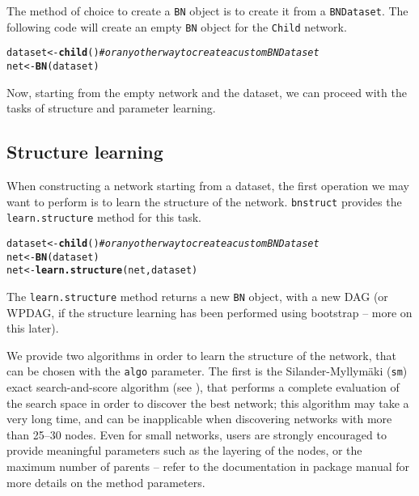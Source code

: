 \documentclass{article}\usepackage[]{graphicx}\usepackage[]{color}
\makeatletter
\newcommand{\hlcom}[1]{\textcolor[rgb]{0.678,0.584,0.686}{\textit{#1}}}%
\newcommand{\hlstd}[1]{\textcolor[rgb]{0.345,0.345,0.345}{#1}}%
\newcommand{\hlkwb}[1]{\textcolor[rgb]{0.69,0.353,0.396}{#1}}%
\newcommand{\hlkwd}[1]{\textcolor[rgb]{0.737,0.353,0.396}{\textbf{#1}}}%
\newenvironment{kframe}{%
 \def\at@end@of@kframe{}%
 \ifinner\ifhmode%
  \def\at@end@of@kframe{\end{minipage}}%
  \begin{minipage}{\columnwidth}%
 \fi\fi%
 \def\FrameCommand##1{\hskip\@totalleftmargin \hskip-\fboxsep
 \colorbox{shadecolor}{##1}\hskip-\fboxsep
     \hskip-\linewidth \hskip-\@totalleftmargin \hskip\columnwidth}%
 \MakeFramed {\advance\hsize-\width
   \@totalleftmargin\z@ \linewidth\hsize
   \@setminipage}}%
 {\par\unskip\endMakeFramed%
 \at@end@of@kframe}
\newenvironment{knitrout}{}{} %
\newcommand{\Robject}[1]{{\texttt{#1}}}
\newcommand{\Rpackage}[1]{{\texttt{#1}}}
\newcommand{\Rmethod}[1]{{\texttt{#1}}}
\makeatother
\begin{document}
The method of choice to create a \Robject{BN} object is to create it from a \Robject{BNDataset}.
The following code will create an empty \Robject{BN} object for the \texttt{Child} network.
\begin{knitrout}
\color{fgcolor}\begin{kframe}
\begin{alltt}
\hlstd{dataset} \hlkwb{<-} \hlkwd{child}\hlstd{()} \hlcom{# or any other way to create a custom BNDataset}
\hlstd{net}     \hlkwb{<-} \hlkwd{BN}\hlstd{(dataset)}
\end{alltt}
\end{kframe}
\end{knitrout}


Now, starting from the empty network and the dataset, we can proceed with the tasks of structure and parameter learning.

\subsection{Structure learning}\label{sec:structurelearning}
When constructing a network starting from a dataset, the first operation we may want to perform is to learn
the structure of the network. \Rpackage{bnstruct} provides the \Rmethod{learn.structure} method for this task.
\begin{knitrout}
\color{fgcolor}\begin{kframe}
\begin{alltt}
\hlstd{dataset} \hlkwb{<-} \hlkwd{child}\hlstd{()} \hlcom{# or any other way to create a custom BNDataset}
\hlstd{net}     \hlkwb{<-} \hlkwd{BN}\hlstd{(dataset)}
\hlstd{net}     \hlkwb{<-} \hlkwd{learn.structure}\hlstd{(net, dataset)}
\end{alltt}
\end{kframe}
\end{knitrout}

The \Rmethod{learn.structure} method returns a new \Robject{BN} object, with a new DAG (or WPDAG, if the structure
learning has been performed using bootstrap -- more on this later).

We provide two algorithms in order to learn the structure of the network, that can be chosen with the \texttt{algo} parameter.
The first is the Silander-Myllym\"aki (\texttt{sm})
exact search-and-score algorithm (see \citet*{silander2012simple}), that performs a complete evaluation of the search space in order to discover
the best network; this algorithm may take a very long time, and can be inapplicable when discovering networks
with more than 25--30 nodes. Even for small networks, users are strongly encouraged to provide
meaningful parameters such as the layering of the nodes, or the maximum number of parents -- refer to the 
documentation in package manual for more details on the method parameters.
\end{document}
